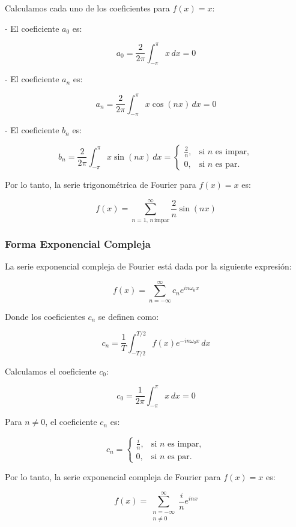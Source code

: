 Calculamos cada uno de los coeficientes para \( f(x) = x \):

- El coeficiente \( a_0 \) es:

\[
a_0 = \frac{2}{2\pi} \int_{-\pi}^{\pi} x \, dx = 0
\]

- El coeficiente \( a_n \) es:

\[
a_n = \frac{2}{2\pi} \int_{-\pi}^{\pi} x \cos(n x) \, dx = 0
\]

- El coeficiente \( b_n \) es:

\[
b_n = \frac{2}{2\pi} \int_{-\pi}^{\pi} x \sin(n x) \, dx = 
\begin{cases} 
	\frac{2}{n}, & \text{si } n \text{ es impar}, \\
	0, & \text{si } n \text{ es par}.
\end{cases}
\]

Por lo tanto, la serie trigonométrica de Fourier para \( f(x) = x \) es:

\[
f(x) = \sum_{n=1, \, n \, \text{impar}}^{\infty} \frac{2}{n} \sin(n x)
\]

\subsubsection{Forma Exponencial Compleja}

La serie exponencial compleja de Fourier está dada por la siguiente expresión:

\[
f(x) = \sum_{n=-\infty}^{\infty} c_n e^{i n \omega_0 x}
\]

Donde los coeficientes \( c_n \) se definen como:

\[
c_n = \frac{1}{T} \int_{-T/2}^{T/2} f(x) e^{-i n \omega_0 x} \, dx
\]

Calculamos el coeficiente \( c_0 \):

\[
c_0 = \frac{1}{2\pi} \int_{-\pi}^{\pi} x \, dx = 0
\]

Para \( n \neq 0 \), el coeficiente \( c_n \) es:

\[
c_n = \begin{cases} 
	\frac{i}{n}, & \text{si } n \text{ es impar}, \\
	0, & \text{si } n \text{ es par}.
\end{cases}
\]

Por lo tanto, la serie exponencial compleja de Fourier para \( f(x) = x \) es:

\[
f(x) = \sum_{\substack{n=-\infty \\ n \neq 0}}^{\infty} \frac{i}{n} e^{i n x}
\]


